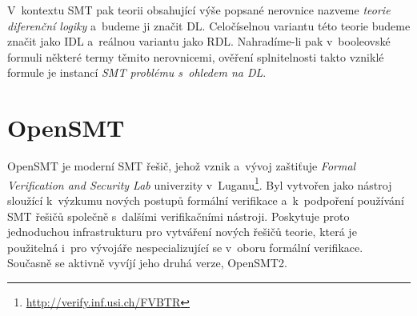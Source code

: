 V~kontextu SMT pak teorii obsahující výše popsané nerovnice nazveme \emph{teorie diferenční logiky} a~budeme ji značit DL. Celočíselnou variantu této teorie budeme značit jako IDL a~reálnou variantu jako RDL. Nahradíme-li pak v~booleovské formuli některé termy těmito nerovnicemi, ověření splnitelnosti takto vzniklé formule je instancí \emph{SMT problému s~ohledem na DL}.

\section{OpenSMT}

OpenSMT je moderní SMT řešič, jehož vznik a~vývoj zaštiťuje \emph{Formal Verification and Security Lab} univerzity v~Luganu\footnote{\url{http://verify.inf.usi.ch/FVBTR}}. Byl vytvořen jako nástroj sloužící k~výzkumu nových postupů formální verifikace a~k~podpoření používání SMT řešičů společně s~dalšími verifikačními nástroji. Poskytuje proto jednoduchou infrastrukturu pro vytváření nových řešičů teorie, která je použitelná i~pro vývojáře nespecializující se v~oboru formální verifikace. Současně se aktivně vyvíjí jeho druhá verze, OpenSMT2.

